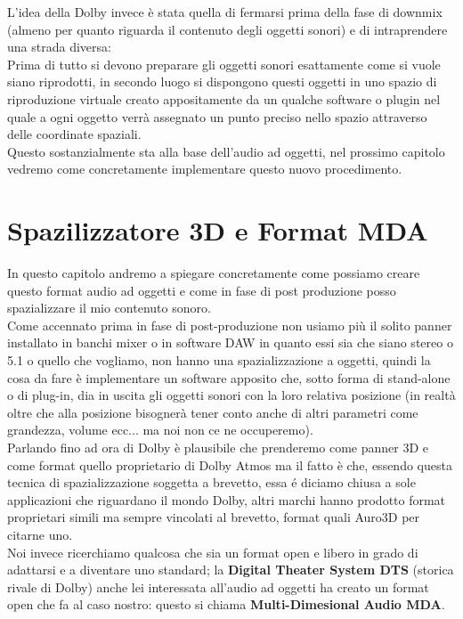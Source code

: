 \documentclass[12pt,a4paper]{report}
\begin{document}
L'idea della Dolby invece è stata quella di fermarsi prima della fase di downmix (almeno per quanto riguarda il contenuto degli oggetti sonori) e di intraprendere una strada diversa:\\

Prima di tutto si devono preparare gli oggetti sonori esattamente come si vuole siano riprodotti, in secondo luogo si dispongono questi oggetti in uno spazio di riproduzione virtuale creato appositamente da un qualche software o plugin nel quale a ogni oggetto verrà assegnato un punto preciso nello spazio attraverso delle coordinate spaziali.\\

Questo sostanzialmente sta alla base dell'audio ad oggetti, nel prossimo capitolo vedremo come concretamente implementare questo nuovo procedimento.



\chapter{Spazilizzatore 3D e Format MDA}\label{dolby}

In questo capitolo andremo a spiegare concretamente come possiamo creare questo format audio ad oggetti e come in fase di post produzione posso spazializzare il mio contenuto sonoro.\\

Come accennato prima in fase di post-produzione non usiamo più il solito panner installato in banchi mixer o in software DAW in quanto essi sia che siano stereo o 5.1 o quello che vogliamo, non hanno una spazializzazione a oggetti, quindi la cosa da fare è implementare un software apposito che, sotto forma di stand-alone o di plug-in, dia in uscita gli oggetti sonori con la loro relativa posizione (in realtà oltre che alla posizione bisognerà tener conto anche di altri parametri come grandezza, volume ecc... ma noi non ce ne occuperemo).\\

Parlando fino ad ora di Dolby è plausibile che prenderemo come panner 3D e come format quello proprietario di Dolby Atmos ma il fatto è che, essendo questa tecnica di spazializzazione soggetta a brevetto, essa é diciamo chiusa a sole applicazioni che riguardano il mondo Dolby, altri marchi hanno prodotto format proprietari simili ma sempre vincolati al brevetto, format quali Auro3D per citarne uno.\\

Noi invece ricerchiamo qualcosa che sia un format open e libero in grado di adattarsi e a diventare uno standard; la \textbf{Digital Theater System DTS} (storica rivale di Dolby) anche lei interessata all'audio ad oggetti ha creato un format open che fa al caso nostro: questo si chiama \textbf{Multi-Dimesional Audio MDA}.\\
\end{document}
